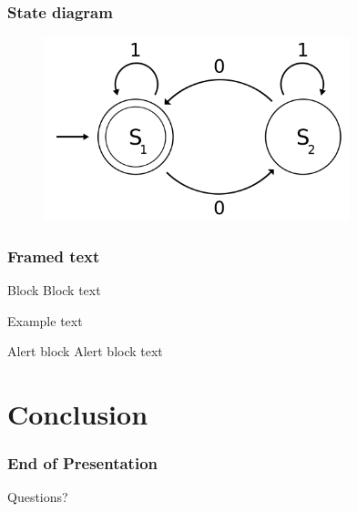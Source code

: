 \documentclass{beamer}
\begin{document}
\begin{frame}
 \frametitle{State diagram}
\begin{figure}
\begin{center}
\includegraphics[width=3.5in]{Images/state-diagram}\\
\end{center}
\end{figure}
\end{frame}

\begin{frame}
\frametitle{Framed text}
\begin{block}{Block}
Block text
\end{block}
\begin{example}{Example}
text
\end{example}
\begin{alertblock}{Alert block}
Alert block text
\end{alertblock}
\end{frame}

\section{Conclusion}

\begin{frame}
 \frametitle{End of Presentation}
Questions?
\end{frame}
\end{document}
